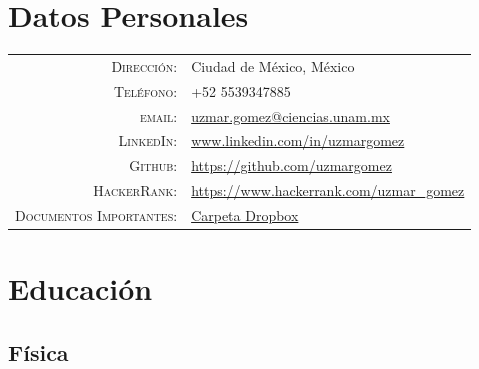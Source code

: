 \documentclass[a4paper,10pt]{article} %
\begin{document}
\section{Datos Personales}

\begin{tabular}{rl}
\textsc{Dirección:} & Ciudad de México, México \\
\textsc{Teléfono:} & +52 5539347885\\
\textsc{email:} & \href{mailto:uzmar.gomez@ciencias.unam.mx}{uzmar.gomez@ciencias.unam.mx}\\
\textsc{LinkedIn:} & \href{www.linkedin.com}{www.linkedin.com/in/uzmargomez}\\
\textsc{Github:} & \href{https://github.com/uzmargomez}{https://github.com/uzmargomez}\\
\textsc{HackerRank:} & \href{https://www.hackerrank.com/uzmar_gomez}{https://www.hackerrank.com/uzmar\_gomez}\\
\textsc{Documentos Importantes:} & \href{https://www.dropbox.com/sh/bgvhqn1rrbzae7b/AAB4xslXKE_fjft6BQ5SR8D8a?dl=0}{Carpeta Dropbox}\\
\end{tabular}


\section{Educación}

\subsection*{Física}
\end{document}
